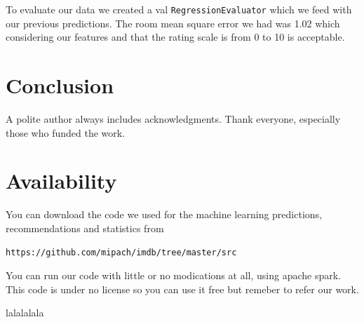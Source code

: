 \documentclass[letterpaper,twocolumn,10pt]{article}
\begin{document}
To evaluate our data we created a val \texttt{RegressionEvaluator} which we feed with our previous predictions. The room mean square error we had was 1.02 which considering our features and that the rating scale is from 0 to 10 is acceptable.

\section{Conclusion}

A polite author always includes acknowledgments.  Thank everyone,
especially those who funded the work. 

\section{Availability}

You can download the code we used for the machine learning predictions, recommendations and statistics from

\begin{center}
{\tt https://github.com/mipach/imdb/tree/master/src}\\
\end{center}

You can run our code with little or no modications at all, using apache spark. This code is under no license so you can use it free but remeber to refer our work.


{\footnotesize 
}
lalalalala
\end{document}
